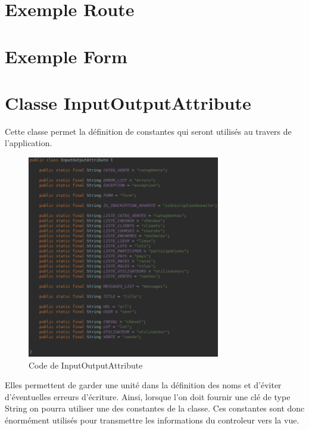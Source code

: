 
	\section{Exemple Route}


	\section{Exemple Form}


	\section{Classe InputOutputAttribute}

		Cette classe permet la définition de constantes qui seront utilisés au travers de l'application.

		\begin{figure}[H]
			\centering\includegraphics[width=0.75\textwidth, keepaspectratio]{res/InputOutputAttribute.png}
			\caption{Code de InputOutputAttribute}
		\end{figure}

		Elles permettent de garder une unité dans la définition des noms et d'éviter d'éventuelles erreurs d'écriture. Ainsi, lorsque l'on doit fournir une clé de type String on pourra utiliser une des constantes de la classe. Ces constantes sont donc énormément utilisés pour transmettre les informations du controleur vers la vue.

